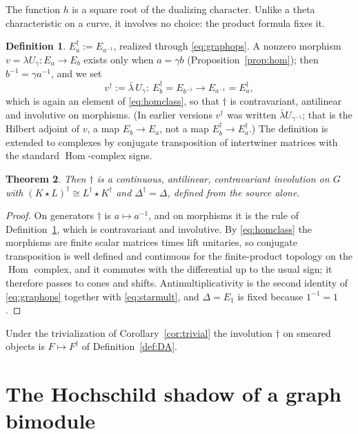 \documentclass[11pt]{amsart}
\newtheorem{theorem}{Theorem}[section]
\theoremstyle{definition}
\newtheorem{definition}[theorem]{Definition}
\theoremstyle{remark}
\newcommand{\Hom}{\operatorname{Hom}}
\begin{document}
The function $h$ is a square root of the dualizing character.  Unlike a theta
characteristic on a curve, it involves no choice: the product formula fixes
it.

\begin{definition}\label{def:dagger}
$E_a^{\dagger}:=E_{a^{-1}}$, realized through \eqref{eq:graphops}.  A
nonzero morphism $v=\lambda U_{\gamma}:E_a\to E_b$ exists only when
$a=\gamma b$ (Proposition~\ref{prop:hom}); then $b^{-1}=\gamma a^{-1}$, and we
set
\[
v^{\dagger}:=\bar\lambda\,U_{\gamma}:\ E_b^{\dagger}=E_{b^{-1}}\longrightarrow
E_{a^{-1}}=E_a^{\dagger},
\]
which is again an element of \eqref{eq:homclass}, so that $\dagger$ is
contravariant, antilinear and involutive on morphisms.  (In earlier versions
$v^{\dagger}$ was written $\bar\lambda U_{\gamma^{-1}}$; that is the Hilbert
adjoint of $v$, a map $E_b\to E_a$, not a map $E_b^{\dagger}\to E_a^{\dagger}$.)
The definition is extended to complexes by conjugate transposition of
intertwiner matrices with the standard $\Hom$-complex signs.
\end{definition}

\begin{theorem}\label{thm:daggerthm}
Then $\dagger$ is a continuous, antilinear,
contravariant involution on $G$ with $(K\star L)^{\dagger}\cong
L^{\dagger}\star K^{\dagger}$ and $\Delta^{\dagger}=\Delta$, defined from the
source alone.
\end{theorem}

\begin{proof}
On generators $\dagger$ is $a\mapsto a^{-1}$, and on morphisms it is the
rule of Definition~\ref{def:dagger}, which is contravariant and involutive.  By
\eqref{eq:homclass} the morphisms are finite scalar matrices times lift
unitaries, so conjugate transposition is well defined and continuous for the
finite-product topology on the $\Hom$ complex, and it commutes with the
differential up to the usual sign; it therefore passes to cones and shifts.
Antimultiplicativity is the second identity of \eqref{eq:graphops} together
with \eqref{eq:starmult}, and $\Delta=E_1$ is fixed because $1^{-1}=1$.
\end{proof}

Under the trivialization of Corollary~\ref{cor:trivial} the involution
$\dagger$ on smeared objects is $F\mapsto F^{\dagger}$ of
Definition~\ref{def:DA}.

\section{The Hochschild shadow of a graph bimodule}\label{sec:shadow}
\end{document}

